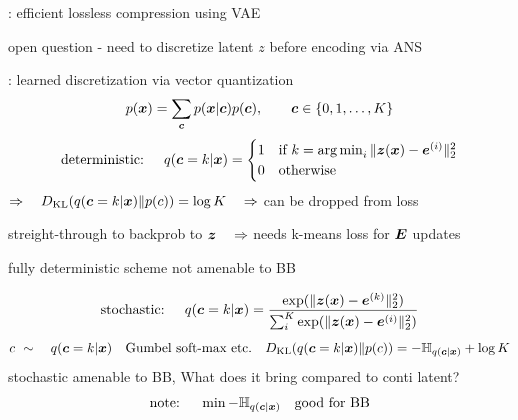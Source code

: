 \documentclass[smaller]{beamer}
\begin{document}
\begin{frame}[t]


\vskip 0.2cm

{\scriptsize
{}: efficient lossless compression using VAE 

\center
\alert{open question - need to discretize latent $z$ before encoding via ANS}

\flushleft
{}: learned discretization via vector quantization
\[p({\bm{x}}) = \sum_{{\bm{c}}} p({\bm{x}} | {\bm{c}}) p({\bm{c}}), \qquad {\bm{c}} \in \{0, 1, \ldots, K\}\]
\vskip -0.2cm
\[\text{deterministic: } \quad
q({\bm{c}} = k \vert {\bm{x}}) = \begin{cases}
1 & \text{if} \ k = \operatorname*{arg\,min}_{i} \Vert {\bm{z}}({\bm{x}}) - {\bm{e}}^{(i)}\Vert_2^2 \\
0 & \text{otherwise}
\end{cases}
\]
$\Rightarrow \quad D_{\mathrm{KL}}(q({\bm{c}} = k \vert {\bm{x}}) \Vert p(c)) = \log K \quad \Rightarrow$ can be dropped from loss
\vskip 0.1cm

streight-through to backprob to ${\bm{z}} \quad \Rightarrow$ needs k-means loss for ${\bm{E}}$ updates

\center
\alert{fully deterministic scheme not amenable to BB}
\vskip 0.1cm

\flushleft
\emph{}
\vskip -0.3cm
\[\text{stochastic: } \quad q({\bm{c}} = k \vert {\bm{x}}) = \frac{\exp(\Vert {\bm{z}}({\bm{x}}) - {\bm{e}}^{(k)}\Vert_2^2)}{\sum_i^K \exp(\Vert {\bm{z}}({\bm{x}}) - {\bm{e}}^{(i)}\Vert_2^2)}\]
\[c\ \sim \quad q({\bm{c}} = k \vert {\bm{x}}) \quad \text{Gumbel soft-max etc.} \quad D_{\mathrm{KL}}(q({\bm{c}} = k \vert {\bm{x}}) \Vert p(c)) = - {\mathbb{H}}_{q({\bm{c}} | {\bm{x}})} + \log K\]
\centering
\alert{stochastic amenable to BB, What does it bring compared to conti latent? 
\vskip -0.4cm
\[\text{note: } \quad \min - {\mathbb{H}}_{q({\bm{c}} | {\bm{x}})} \quad \text{good for BB}\]
}
}

\end{frame}


\end{document}
